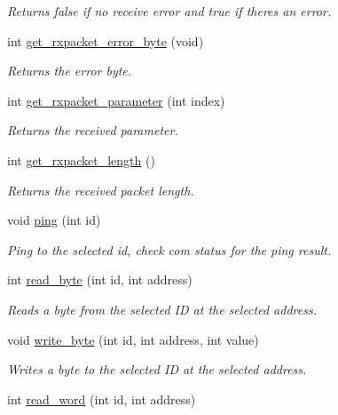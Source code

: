 \begin{DoxyCompactItemize}
\begin{DoxyCompactList}\small\item\em Returns false if no receive error and true if there\textquotesingle{}s an error. \end{DoxyCompactList}\item 
int \hyperlink{classdynamixel_a6e62341ef9f51b6e152e769bd7be9d75}{get\+\_\+rxpacket\+\_\+error\+\_\+byte} (void)
\begin{DoxyCompactList}\small\item\em Returns the error byte. \end{DoxyCompactList}\item 
int \hyperlink{classdynamixel_a68b5fa99719a9aec0734ecfb0635503b}{get\+\_\+rxpacket\+\_\+parameter} (int index)
\begin{DoxyCompactList}\small\item\em Returns the received parameter. \end{DoxyCompactList}\item 
int \hyperlink{classdynamixel_ae9cc18fdeda8329f68fa0f2f0a7a9aba}{get\+\_\+rxpacket\+\_\+length} ()
\begin{DoxyCompactList}\small\item\em Returns the received packet length. \end{DoxyCompactList}\item 
void \hyperlink{classdynamixel_af2bd714423e7c4fc089762805c0c71f3}{ping} (int id)
\begin{DoxyCompactList}\small\item\em Ping to the selected id, check com status for the ping result. \end{DoxyCompactList}\item 
int \hyperlink{classdynamixel_a888404b41c4c4395a0b745c77ff2cea9}{read\+\_\+byte} (int id, int address)
\begin{DoxyCompactList}\small\item\em Reads a byte from the selected I\+D at the selected address. \end{DoxyCompactList}\item 
void \hyperlink{classdynamixel_a66c1e32cc45dd46d329f1fc212e46a3d}{write\+\_\+byte} (int id, int address, int value)
\begin{DoxyCompactList}\small\item\em Writes a byte to the selected I\+D at the selected address. \end{DoxyCompactList}\item 
int \hyperlink{classdynamixel_a45e99341e82c5114f6e829c9141bf96f}{read\+\_\+word} (int id, int address)

\end{DoxyCompactItemize}
